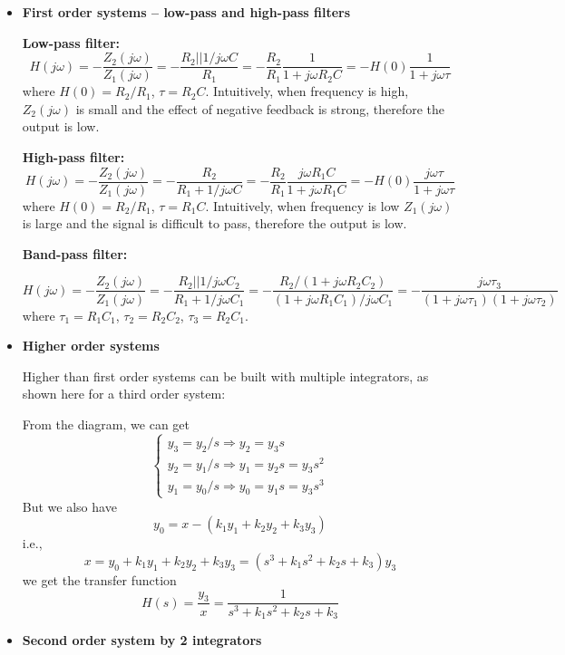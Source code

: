 \begin{itemize}
\item {\bf First order systems -- low-pass and high-pass filters}


{\bf Low-pass filter:}
\[ H(j\omega)=-\frac{Z_2(j\omega)}{Z_1(j\omega)}=-\frac{R_2||1/j\omega C}{R_1}
=-\frac{R_2}{R_1}\frac{1}{1+j\omega R_2C}
=-H(0)\frac{1}{1+j\omega \tau} \]
where $H(0)=R_2/R_1$, $\tau=R_2C$. Intuitively, when frequency is high,
$Z_2(j\omega)$ is small and the effect of negative feedback is strong,
therefore the output is low.

{\bf High-pass filter:}
\[ H(j\omega)=-\frac{Z_2(j\omega)}{Z_1(j\omega)}=-\frac{R_2}{R_1+1/j\omega C}
=-\frac{R_2}{R_1}\frac{j\omega R_1C}{1+j\omega R_1C}
=-H(0)\frac{j\omega \tau}{1+j\omega \tau} \]
where $H(0)=R_2/R_1$, $\tau=R_1C$. Intuitively, when frequency is low
$Z_1(j\omega)$ is large and the signal is difficult to pass, therefore the 
output is low.

{\bf Band-pass filter:}


\[ H(j\omega)=-\frac{Z_2(j\omega)}{Z_1(j\omega)}
=-\frac{R_2||1/j\omega C_2}{R_1+1/j\omega C_1}
=-\frac{R_2/(1+j\omega R_2C_2)}{(1+j\omega R_1C_1)/j\omega C_1}
=-\frac{j\omega \tau_3}{(1+j\omega \tau_1)(1+j\omega \tau_2)} \]
where $\tau_1=R_1C_1$, $\tau_2=R_2C_2$, $\tau_3=R_2C_1$.

\item {\bf Higher order systems}

Higher than first order systems can be built with multiple integrators, as 
shown here for a third order system:


From the diagram, we can get
\[
\left\{ \begin{array}{l}
	y_3=y_2/s \Longrightarrow y_2=y_3s	\\
	y_2=y_1/s \Longrightarrow y_1=y_2s=y_3s^2	\\
	y_1=y_0/s \Longrightarrow y_0=y_1s=y_3s^3	
\end{array} \right.
\]
But we also have
\[	y_0=x-(k_1y_1+k_2y_2+k_3y_3)	\]
i.e., 
\[	x=y_0+k_1y_1+k_2y_2+k_3y_3=(s^3+k_1s^2+k_2s+k_3) y_3	\]
we get the transfer function
\[
	H(s)=\frac{y_3}{x}=\frac{1}{s^3+k_1s^2+k_2s+k_3}
\]


\item {\bf Second order system by 2 integrators}



\end{itemize}

